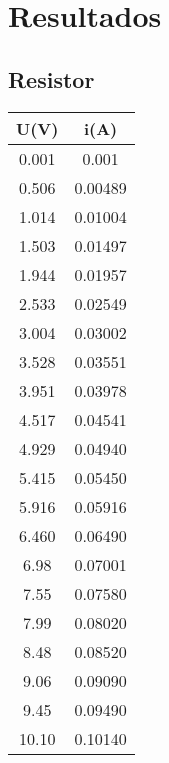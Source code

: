 \section{Resultados}
    \subsection{Resistor}
        \begin{tabular}{||c | c||}
            \hline
            U(V)    &   i(A)    \\
            \hline
            0.001   &   0.001   \\
            0.506   &   0.00489 \\
            1.014   &   0.01004 \\
            1.503   &   0.01497 \\
            1.944   &   0.01957 \\
            2.533   &   0.02549 \\
            3.004   &   0.03002 \\
            3.528   &   0.03551 \\
            3.951   &   0.03978 \\
            4.517   &   0.04541 \\
            4.929   &   0.04940 \\
            5.415   &   0.05450 \\
            5.916   &   0.05916 \\
            6.460   &   0.06490 \\
            6.98    &   0.07001 \\
            7.55    &   0.07580 \\
            7.99    &   0.08020 \\
            8.48    &   0.08520 \\
            9.06    &   0.09090 \\
            9.45    &   0.09490 \\
            10.10   &   0.10140 \\
            \hline
        \end{tabular}


